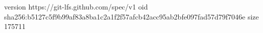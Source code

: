 version https://git-lfs.github.com/spec/v1
oid sha256:b5127c5f9b99af83a8ba1c2a1f2f57afcb42acc95ab2bfe097fad57d79f7046e
size 175711
